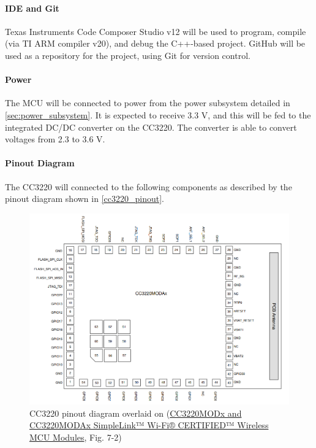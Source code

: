 \paragraph{IDE and Git}
Texas Instruments Code Composer Studio v12 will be used to program,
compile (via TI ARM compiler v20), and debug the C++-based project. GitHub
will be used as a repository for the project, using Git for version
control.

\paragraph{Power}
The MCU will be connected to power from the power subsystem detailed in 
\autoref{sec:power_subsystem}. It is expected to receive 3.3 V, and this will
be fed to the integrated DC/DC converter on the CC3220. The converter is able
to convert voltages from 2.3 to 3.6 V.

\paragraph{Pinout Diagram}
The CC3220 will connected to the following components as described by the
pinout diagram shown in \autoref{cc3220_pinout}.
\begin{figure}[H]
    \caption{CC3220 pinout diagram overlaid on (\href{https://www.ti.com/lit/ds/symlink/cc3220mod.pdf}{CC3220MODx and CC3220MODAx SimpleLink™ Wi-Fi® CERTIFIED™ Wireless MCU Modules}, Fig. 7-2)}
    \label{cc3220_pinout}
    \centering
    \includegraphics[width=\textwidth]{images/cc3220_pinout.png}
\end{figure}